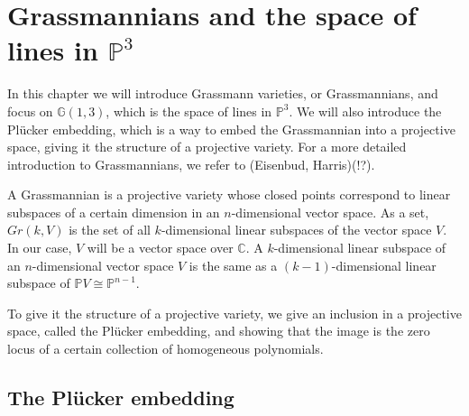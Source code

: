 \chapter{Grassmannians and the space of lines in \texorpdfstring{$\mathbb{P}^3$}{P3}}
\label{grassmannians}

In this chapter we will introduce Grassmann varieties, or Grassmannians, and focus on $\mathbb{G}(1, 3)$, which is the space of lines in $\mathbb{P}^3$. We will also introduce the Plücker embedding, which is a way to embed the Grassmannian into a projective space, giving it the structure of a projective variety. For a more detailed introduction to Grassmannians, we refer to (Eisenbud, Harris)(!?).

A Grassmannian is a projective variety whose closed points correspond to linear subspaces of a certain dimension in an $n$-dimensional vector space. As a set, $Gr(k, V)$ is the set of all $k$-dimensional linear subspaces of the vector space $V$. In our case, $V$ will be a vector space over $\mathbb{C}$. A $k$-dimensional linear subspace of an $n$-dimensional vector space $V$ is the same as a $(k - 1)$-dimensional linear subspace of $\mathbb{P}V \cong \mathbb{P}^{n-1}$. 

To give it the structure of a projective variety, we give an inclusion in a projective space, called the Plücker embedding, and showing that the image is the zero locus of a certain collection of homogeneous polynomials.

\section{The Plücker embedding}

